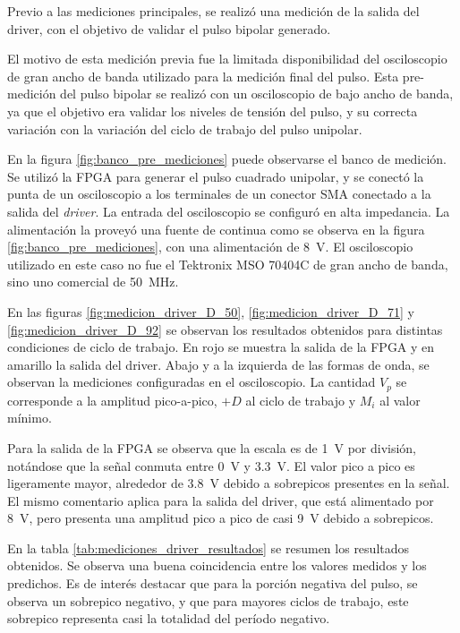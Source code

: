 Previo a las mediciones principales, se realizó una medición de la salida del driver,
con el objetivo de validar el pulso bipolar generado.

El motivo de esta medición previa fue la limitada disponibilidad del
osciloscopio de gran ancho de banda utilizado para la medición final del pulso.
Esta pre-medición del pulso bipolar se realizó con un osciloscopio de bajo ancho
de banda, ya que el objetivo era validar los niveles de tensión del pulso, y su
correcta variación con la variación del ciclo de trabajo del pulso unipolar.

En la figura \ref{fig:banco_pre_mediciones} puede observarse el banco de
medición. Se utilizó la FPGA para generar el pulso cuadrado unipolar, y se
conectó la punta de un osciloscopio a los terminales de un conector SMA
conectado a la salida del \textit{driver}. La entrada del osciloscopio se
configuró en alta impedancia. La alimentación la proveyó una fuente de continua
como se observa en la figura \ref{fig:banco_pre_mediciones}, con una
alimentación de \qty{8}{\volt}. El osciloscopio utilizado en este caso no fue el
Tektronix MSO 70404C de gran ancho de banda, sino uno comercial de
\qty{50}{\mega\hertz}.

En las figuras \ref{fig:medicion_driver_D_50}, \ref{fig:medicion_driver_D_71} y
\ref{fig:medicion_driver_D_92} se observan los resultados obtenidos para distintas
condiciones de ciclo de trabajo. En rojo se muestra la salida de la FPGA y en
amarillo la salida del driver. Abajo y a la izquierda de las formas de onda,
se observan la mediciones configuradas en el osciloscopio. La cantidad $V_p$ se
corresponde a la amplitud pico-a-pico, $+D$ al ciclo de trabajo y $M_i$ al valor
mínimo.

Para la salida de la FPGA se observa que la escala es de \qty{1}{\volt} por
división, notándose que la señal conmuta entre \qty{0}{\volt} y
\qty{3.3}{\volt}. El valor pico a pico es ligeramente mayor, alrededor de
\qty{3.8}{\volt} debido a sobrepicos presentes en la señal. El mismo comentario
aplica para la salida del driver, que está alimentado por \qty{8}{\volt}, pero
presenta una amplitud pico a pico de casi \qty{9}{\volt} debido a sobrepicos.

En la tabla \ref{tab:mediciones_driver_resultados} se resumen los resultados
obtenidos. Se observa una buena coincidencia entre los valores medidos y los
predichos. Es de interés destacar que para la porción negativa del pulso, se
observa un sobrepico negativo, y que para mayores ciclos de trabajo, este
sobrepico representa casi la totalidad del período negativo.

